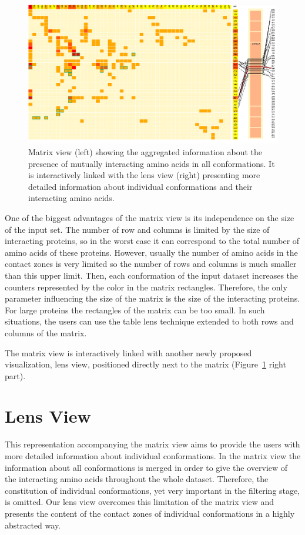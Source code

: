 \documentclass[journal]{vgtc}                %
\begin{document}
\begin{figure}[bt]
  \centering
  \includegraphics[width=1.0\columnwidth]{matrixlens.png}
  \caption{Matrix view (left) showing the aggregated information about the presence of mutually interacting amino acids in all conformations. It is interactively linked with the lens view (right) presenting more detailed information about individual conformations and their interacting amino acids.}
  \label{fig:matrixlens}
\end{figure}

One of the biggest advantages of the matrix view is its independence on the size of the input set.
The number of row and columns is limited by the size of interacting proteins, so in the worst case it can correspond to the total number of amino acids of these proteins.
However, usually the number of amino acids in the contact zones is very limited so the number of rows and columns is much smaller than this upper limit.
Then, each conformation of the input dataset increases the counters represented by the color in the matrix rectangles.
Therefore, the only parameter influencing the size of the matrix is the size of the interacting proteins.
For large proteins the rectangles of the matrix can be too small.
In such situations, the users can use the table lens technique extended to both rows and columns of the matrix.

The matrix view is interactively linked with another newly proposed visualization, lens view, positioned directly next to the matrix (Figure~\ref{fig:matrixlens} right part). 

\section{Lens View}
This representation accompanying the matrix view aims to provide the users with more detailed information about individual conformations.
In the matrix view the information about all conformations is merged in order to give the overview of the interacting amino acids throughout the whole dataset.
Therefore, the constitution of individual conformations, yet very important in the filtering stage, is omitted.
Our lens view overcomes this limitation of the matrix view and presents the content of the contact zones of individual conformations in a highly abstracted way.
\end{document}
